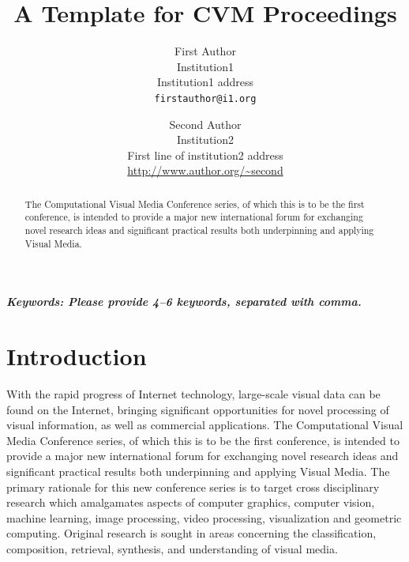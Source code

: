 \documentclass[10pt,twocolumn,letterpaper]{article}
\newcommand{\keywords}[1]{{\bf \emph{Keywords: #1}}}
\begin{document}
\title{A Template for CVM Proceedings}

\author{First Author\\
Institution1\\
Institution1 address\\
{\tt\small firstauthor@i1.org}
\and
Second Author\\
Institution2\\
First line of institution2 address\\
{\small\url{http://www.author.org/~second}}
}

\maketitle

\begin{abstract}
    The Computational Visual Media Conference series, of which this is to be the first conference, is intended to provide a major new international forum for exchanging novel research ideas and significant practical results both underpinning and applying Visual Media.
\end{abstract}

\keywords{Please provide 4–6 keywords, separated with comma.}

\section{Introduction}

With the rapid progress of Internet technology, large-scale visual data can be found on the Internet, bringing significant opportunities for novel processing of visual information, as well as commercial applications.
The Computational Visual Media Conference series, of which this is to be the first conference, is intended to provide a major new international forum for exchanging novel research ideas and significant practical results both underpinning and applying Visual Media. The primary rationale for this new conference series is to target cross disciplinary research which amalgamates aspects of computer graphics, computer vision, machine learning, image processing, video processing, visualization and geometric computing. Original research is sought in areas concerning the classification, composition, retrieval, synthesis, and understanding of visual media.
\end{document}
